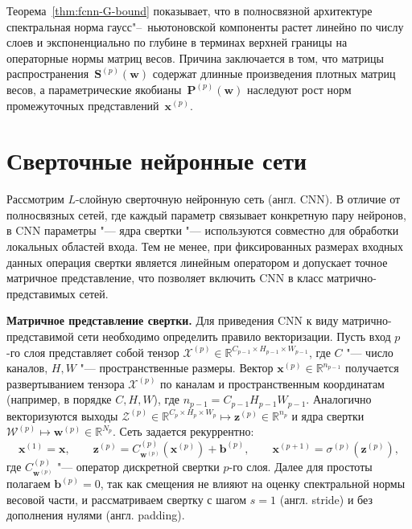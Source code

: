 Теорема~\ref{thm:fcnn-G-bound} показывает, что в полносвязной архитектуре спектральная норма гаусс"--~ньютоновской компоненты растет линейно по числу слоев и экспоненциально по глубине в терминах верхней границы на операторные нормы матриц весов. Причина заключается в том, что матрицы распространения~$\mathbf{S}^{(p)}(\mathbf{w})$ содержат длинные произведения плотных матриц весов, а параметрические якобианы~$\mathbf{P}^{(p)}(\mathbf{w})$ наследуют рост норм промежуточных представлений~$\mathbf{x}^{(p)}$.

\section{Сверточные нейронные сети}

Рассмотрим $L$-слойную сверточную нейронную сеть (англ. CNN). В отличие от полносвязных сетей, где каждый параметр связывает конкретную пару нейронов, в CNN параметры "--- ядра свертки "--- используются совместно для обработки локальных областей входа. Тем не менее, при фиксированных размерах входных данных операция свертки является линейным оператором и допускает точное матричное представление, что позволяет включить CNN в класс матрично-представимых сетей.

\textbf{Матричное представление свертки.} Для приведения CNN к виду матрично-представимой сети необходимо определить правило векторизации. Пусть вход $p$-го слоя представляет собой тензор $\mathcal{X}^{(p)} \in \mathbb{R}^{C_{p-1} \times H_{p-1} \times W_{p-1}}$, где $C$ "--- число каналов, $H, W$ "--- пространственные размеры. Вектор $\mathbf{x}^{(p)} \in \mathbb{R}^{n_{p-1}}$ получается развертыванием тензора $\mathcal{X}^{(p)}$ по каналам и пространственным координатам (например, в порядке $C, H, W$), где $n_{p-1} = C_{p-1} H_{p-1} W_{p-1}$. Аналогично векторизуются выходы $\mathcal{Z}^{(p)} \in \mathbb{R}^{C_p \times H_p \times W_p} \mapsto \mathbf{z}^{(p)} \in \mathbb{R}^{n_p}$ и ядра свертки $\mathcal{W}^{(p)} \mapsto \mathbf{w}^{(p)} \in \mathbb{R}^{N_p}$. Сеть задается рекуррентно:
\begin{equation}
    \label{eq:cnn-recurrence}
    \mathbf{x}^{(1)} = \mathbf{x},
    \qquad
    \mathbf{z}^{(p)} = C^{(p)}_{\mathbf{w}^{(p)}}\left(\mathbf{x}^{(p)}\right) + \mathbf{b}^{(p)},
    \qquad
    \mathbf{x}^{(p+1)} = \sigma^{(p)}\left(\mathbf{z}^{(p)}\right),
\end{equation}
где $C^{(p)}_{\mathbf{w}^{(p)}}$ "--- оператор дискретной свертки $p$-го слоя. Далее для простоты полагаем $\mathbf{b}^{(p)} = 0$, так как смещения не влияют на оценку спектральной нормы весовой части, и рассматриваем свертку с шагом $s=1$ (англ. stride) и без дополнения нулями (англ. padding).

